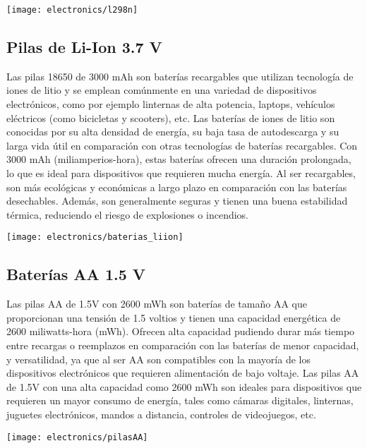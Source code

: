 \begin{center}
  \centering
  \texttt{[image: electronics/l298n]}
  \label{fig:l298n}
\end{center}

\subsection{Pilas de Li-Ion 3.7 V}
Las pilas 18650 de 3000 mAh son baterías recargables que utilizan tecnología de iones de litio y se emplean comúnmente en una variedad de dispositivos electrónicos, como por ejemplo linternas de alta potencia, laptops, vehículos eléctricos (como bicicletas y scooters), etc. Las baterías de iones de litio son conocidas por su alta densidad de energía, su baja tasa de autodescarga y su larga vida útil en comparación con otras tecnologías de baterías recargables. Con 3000 mAh (miliamperios-hora), estas baterías ofrecen una duración prolongada, lo que es ideal para dispositivos que requieren mucha energía. Al ser recargables, son más ecológicas y económicas a largo plazo en comparación con las baterías desechables. Además, son generalmente seguras y tienen una buena estabilidad térmica, reduciendo el riesgo de explosiones o incendios.

\begin{center}
  \centering
  \texttt{[image: electronics/baterias\_liion]}
  \label{fig:baterias_liion}
\end{center}

\subsection{Baterías AA 1.5 V}

Las pilas AA de 1.5V con 2600 mWh son baterías de tamaño AA que proporcionan una tensión de 1.5 voltios y tienen una capacidad energética de 2600 miliwatts-hora (mWh). Ofrecen alta capacidad  pudiendo durar más tiempo entre recargas o reemplazos en comparación con las baterías de menor capacidad, y versatilidad, ya que al ser AA son compatibles con la mayoría de los dispositivos electrónicos que requieren alimentación de bajo voltaje.
Las pilas AA de 1.5V con una alta capacidad como 2600 mWh son ideales para dispositivos que requieren un mayor consumo de energía, tales como cámaras digitales, linternas, juguetes electrónicos, mandos a distancia, controles de videojuegos, etc.
\begin{center}
  \centering
  \texttt{[image: electronics/pilasAA]}
  \label{fig:pilasAA}
\end{center}



